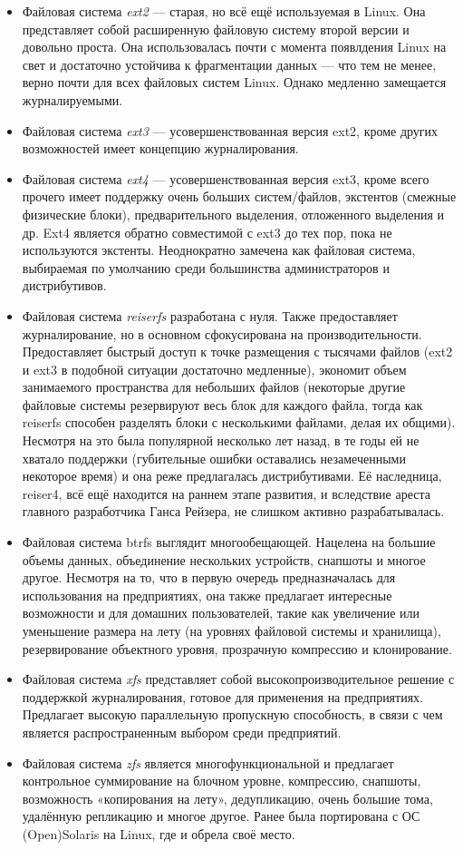 \documentclass[10pt]{book}
\begin{document}
\begin{itemize}
  \item Файловая система \textit{ext2} — старая, но всё ещё используемая в Linux. Она представляет собой расширенную файловую систему второй версии и довольно проста. Она использовалась почти с момента появлдения Linux на свет и достаточно устойчива к фрагментации данных — что тем не менее, верно почти для всех файловых систем Linux. Однако медленно замещается журналируемыми.
  \item Файловая система \textit{ext3} — усовершенствованная версия ext2, кроме других возможностей имеет концепцию журналирования.
  \item Файловая система \textit{ext4} — усовершенствованная версия ext3, кроме  всего прочего имеет поддержку очень больших систем/файлов, экстентов (смежные физические блоки), предварительного выделения, отложенного выделения и др. Ext4 является обратно совместимой с ext3 до тех пор, пока не используются экстенты.  Неоднократно замечена как файловая система, выбираемая по умолчанию среди большинства администраторов и дистрибутивов.
  \item Файловая система \textit{reiserfs} разработана с нуля. Также предоставляет журналирование, но в основном сфокусирована на производительности. Предоставляет быстрый доступ к точке размещения с тысячами файлов (ext2 и ext3 в подобной ситуации достаточно медленные), экономит объем занимаемого пространства для небольших файлов (некоторые другие файловые системы резервируют весь блок для каждого файла, тогда как reiserfs способен разделять блоки с несколькими файлами, делая их общими). Несмотря на это была популярной несколько лет назад, в те годы ей не хватало поддержки (губительные ошибки оставались незамеченными некоторое время) и она реже предлагалась дистрибутивами. Её наследница, reiser4, всё ещё находится на раннем этапе развития, и вследствие ареста главного разработчика Ганса Рейзера, не слишком активно  разрабатывалась.
  \item Файловая система btrfs выглядит многообещающей. Нацелена на большие объемы данных, объединение нескольких устройств, снапшоты и многое другое. Несмотря на то, что в первую очередь предназначалась для использования на предприятиях, она также предлагает интересные возможности и для домашних пользователей, такие как увеличение или уменьшение размера на лету (на уровнях файловой системы и хранилища), резервирование объектного уровня, прозрачную компрессию и клонирование.
  \item Файловая система \textit{xfs} представляет собой высокопроизводительное решение с поддержкой журналирования, готовое для применения на предприятиях. Предлагает высокую параллельную пропускную способность, в связи с чем является распространенным выбором среди предприятий.
  \item Файловая система \textit{zfs} является многофункциональной и предлагает контрольное суммирование на блочном уровне, компрессию, снапшоты, возможность «копирования на лету», дедупликацию, очень большие тома, удалённую репликацию и многое другое. Ранее была портирована с ОС (Open)Solaris на Linux, где и обрела своё место.
\end{itemize}
\end{document}
